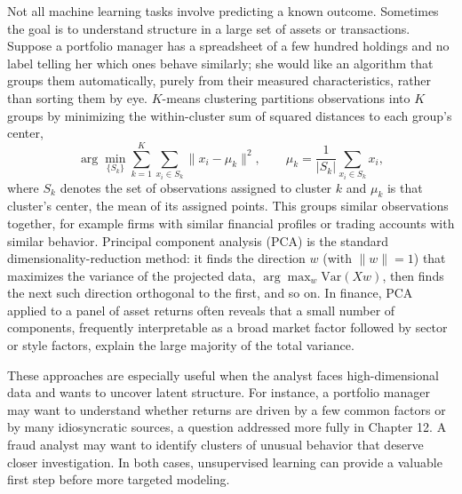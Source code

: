 \documentclass[../ai_in_finance]{subfiles}
\begin{document}
Not all machine learning tasks involve predicting a known outcome. Sometimes the goal is to understand structure in a large set of assets or transactions. Suppose a portfolio manager has a spreadsheet of a few hundred holdings and no label telling her which ones behave similarly; she would like an algorithm that groups them automatically, purely from their measured characteristics, rather than sorting them by eye. $K$-means clustering partitions observations into $K$ groups by minimizing the within-cluster sum of squared distances to each group's center,
\begin{equation*}
\arg\min_{\{S_k\}} \sum_{k=1}^K \sum_{x_i \in S_k} \|x_i - \mu_k\|^2, \qquad \mu_k = \frac{1}{|S_k|}\sum_{x_i \in S_k} x_i,
\end{equation*}
where $S_k$ denotes the set of observations assigned to cluster $k$ and $\mu_k$ is that cluster's center, the mean of its assigned points. This groups similar observations together, for example firms with similar financial profiles or trading accounts with similar behavior. Principal component analysis (PCA) is the standard dimensionality-reduction method: it finds the direction $w$ (with $\|w\|=1$) that maximizes the variance of the projected data, $\arg\max_w \text{Var}(Xw)$, then finds the next such direction orthogonal to the first, and so on. In finance, PCA applied to a panel of asset returns often reveals that a small number of components, frequently interpretable as a broad market factor followed by sector or style factors, explain the large majority of the total variance.

These approaches are especially useful when the analyst faces high-dimensional data and wants to uncover latent structure. For instance, a portfolio manager may want to understand whether returns are driven by a few common factors or by many idiosyncratic sources, a question addressed more fully in Chapter 12. A fraud analyst may want to identify clusters of unusual behavior that deserve closer investigation. In both cases, unsupervised learning can provide a valuable first step before more targeted modeling.
\end{document}
